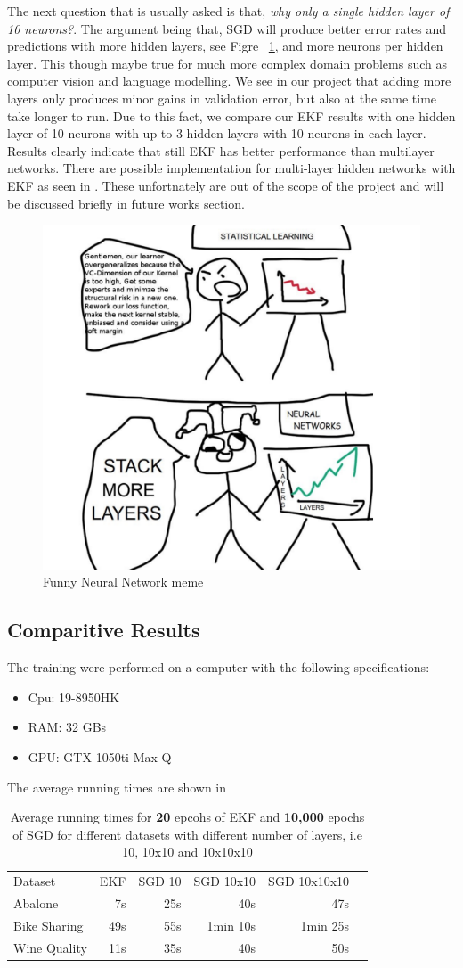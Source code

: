 \documentclass{article}
\begin{document}
The next question that is usually asked is that, \textit{why only a single hidden layer of 10 neurons?}. The argument being that, SGD will produce better error rates and predictions with more hidden layers, see Figre~ \ref{fig:stack}, and more neurons per hidden layer. This though maybe true for much more complex domain problems such as computer vision and language modelling. We see in our project that adding more layers only produces minor gains in validation error, but also at the same time take longer to run. Due to this fact, we compare our EKF results with one hidden layer of 10 neurons with up to 3 hidden layers with 10 neurons in each layer. Results clearly indicate that still EKF has better performance than multilayer networks. There are possible implementation for multi-layer hidden networks with EKF as seen in \cite{Evol}. These unfortnately are out of the scope of the project and will be discussed briefly in future works section.
\begin{figure}[ht]
    \centering
    \includegraphics[width=0.5\linewidth]{stack.png}
    \caption{Funny Neural Network meme}
    \label{fig:stack}
\end{figure}
\clearpage
\subsection{Comparitive Results}
The training were performed on a computer with the following specifications:
\begin{itemize}
    \item Cpu: 19-8950HK
    \item RAM: 32 GBs
    \item GPU: GTX-1050ti Max Q
\end{itemize}
The average running times are shown in 
\begin{table}[ht]
    \centering
    \begin{tabular}{lrrrrr}
        \hline
         Dataset & EKF  & SGD 10 & SGD 10x10 & SGD 10x10x10 \\
         \hhline{======}
         Abalone & 7s & 25s & 40s & 47s \\
         Bike Sharing & 49s & 55s & 1min 10s & 1min 25s \\
         Wine Quality & 11s & 35s & 40s & 50s\\
    \end{tabular}
    \caption{Average running times for \textbf{20} epcohs of EKF and \textbf{10,000} epochs of SGD for different datasets with different number of layers, i.e 10, 10x10 and 10x10x10}
    \label{tab:my_label}
\end{table}
\end{document}
